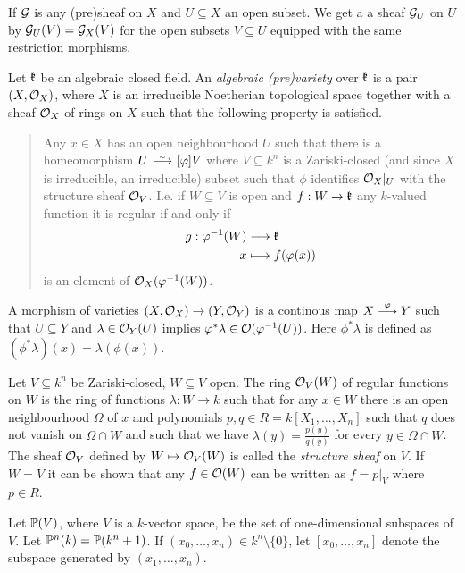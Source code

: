 \documentclass[a4paper,parskip=full,numbers=enddot]{scrreprt}
\begin{document}
\begin{defi}
\begin{rem*}
  If $\Gg$ is any (pre)sheaf on $X$ and $U\subseteq X$ an open subset. We get a a sheaf $\Gg_U$ on $U$ by $\Gg_U(V) = \Gg_X(V)$ for the open subsets $V\subseteq U$ equipped with the same restriction morphisms.
\end{rem*}
\begin{defi} 
    Let $\kk$ be an algebraic closed field. An \emph{algebraic (pre)variety} over $\kk$ is a pair $(X,\Oo_X)$, where $X$ is an irreducible Noetherian topological space together with a sheaf $\Oo_X$ of rings on $X$ such that the following property is satisfied.
    \begin{quote}
        Any $x\in X$ has an open neighbourhood $U$ such that there is a homeomorphism $U\isomorphism[\phi] V$ where $V\subseteq k^n$ is a Zariski-closed (and since $X$ is irreducible, an irreducible) subset such that $\phi$ identifies $\Oo_X|_U$ with the structure sheaf $\Oo_V$. I.e. if $W \subseteq V$ is open and $f: W\to \kk$ any $k$-valued function it is regular if and only if 
        \begin{align*}
            g: \phi^{-1}(W) &\longto \kk\\
            x&\longmapsto f(\phi(x))
        \end{align*}
        is an element of $\Oo_X(\phi^{-1}(W))$. 
    \end{quote}
    A morphism of varieties $(X,\Oo_X) \to (Y,\Oo_Y)$ is a continous map $X\morphism[\phi] Y$ such that $U\subseteq Y$ and $\lambda \in \Oo_Y(U)$ implies $\phi^\ast \lambda \in \Oo(\phi^{-1}(U))$. Here $\phi^\ast\lambda$ is defined as $(\phi^\ast\lambda)(x) = \lambda(\phi(x))$.

\end{defi}
\begin{rem*}
    \begin{alphanumerate}
     \item Let $V\subseteq k^n$ be Zariski-closed, $W\subseteq V$ open. The ring $\Oo_V(W)$ of regular functions on $W$ is the ring of functions $\lambda: W\to k$ such that for any $x\in W$ there is an open neighbourhood $\Omega$ of $x$ and polynomials $p,q\in R= k[X_1,\ldots,X_n]$ such that $q$ does not vanish on $\Omega\cap W$ and such that we have $\lambda(y) = \frac{p(y)}{q(y)}$ for every $y\in \Omega\cap W$. The sheaf $\Oo_V$ defined by $W\mapsto \Oo_V(W)$ is called the \emph{structure sheaf} on $V$. If $W=V$ it can be shown that any $f\in \Oo(W)$ can be written as $f=p|_V$ where $p\in R$.
     \item Let $\IP(V)$, where $V$ is a $k$-vector space, be the set of one-dimensional subspaces of $V$. Let $\IP^n(k) = \IP(k^n+1)$. If $(x_0,\ldots,x_n)\in k^n\setminus\{0\}$, let $[x_0,\ldots,x_n]$ denote the subspace generated by $(x_1,\ldots, x_n)$.
     

\end{alphanumerate}
\end{rem*}
\end{defi}
\end{document}
